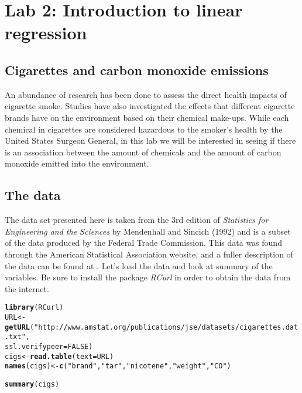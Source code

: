 \documentclass{article}\usepackage[]{graphicx}\usepackage[]{color}
\makeatletter
\newcommand{\hlnum}[1]{\textcolor[rgb]{0.686,0.059,0.569}{#1}}%
\newcommand{\hlstr}[1]{\textcolor[rgb]{0.192,0.494,0.8}{#1}}%
\newcommand{\hlstd}[1]{\textcolor[rgb]{0.345,0.345,0.345}{#1}}%
\newcommand{\hlkwb}[1]{\textcolor[rgb]{0.69,0.353,0.396}{#1}}%
\newcommand{\hlkwc}[1]{\textcolor[rgb]{0.333,0.667,0.333}{#1}}%
\newcommand{\hlkwd}[1]{\textcolor[rgb]{0.737,0.353,0.396}{\textbf{#1}}}%
\newenvironment{kframe}{%
 \def\at@end@of@kframe{}%
 \ifinner\ifhmode%
  \def\at@end@of@kframe{\end{minipage}}%
  \begin{minipage}{\columnwidth}%
 \fi\fi%
 \def\FrameCommand##1{\hskip\@totalleftmargin \hskip-\fboxsep
 \colorbox{shadecolor}{##1}\hskip-\fboxsep
     \hskip-\linewidth \hskip-\@totalleftmargin \hskip\columnwidth}%
 \MakeFramed {\advance\hsize-\width
   \@totalleftmargin\z@ \linewidth\hsize
   \@setminipage}}%
 {\par\unskip\endMakeFramed%
 \at@end@of@kframe}
\newenvironment{knitrout}{}{} %
\makeatother
\begin{document}

\section*{Lab 2: Introduction to linear regression}

\subsection*{Cigarettes and carbon monoxide emissions}

An abundance of research has been done to assess the direct health impacts of cigarette smoke. Studies have also investigated the effects that different cigarette brands have on the environment based on their chemical make-ups. While each chemical in cigarettes are considered hazardous to the smoker's health by the United States Surgeon General, in this lab we will be interested in seeing if there is an association between the amount of chemicals and the amount of carbon monoxide emitted into the environment. 

\subsection*{The data}

The data set presented here is taken from the 3rd edition of \emph{Statistics for
Engineering and the Sciences} by Mendenhall and Sincich (1992) and is a subset of the data produced by the Federal Trade Commission. This data was found through the American Statistical Association website, and a fuller description of the data can be found at . Let's load the data and look at summary of the variables. Be sure to install the package \emph{RCurl} in order to obtain the data from the internet.

\begin{knitrout}
\color{fgcolor}\begin{kframe}
\begin{alltt}
\hlkwd{library}\hlstd{(RCurl)}
\hlstd{URL} \hlkwb{<-}\hlkwd{getURL}\hlstd{(}\hlstr{"http://www.amstat.org/publications/jse/datasets/cigarettes.dat.txt"}\hlstd{,}
             \hlkwc{ssl.verifypeer}\hlstd{=}\hlnum{FALSE}\hlstd{)}
\hlstd{cigs} \hlkwb{<-}\hlkwd{read.table}\hlstd{(}\hlkwc{text}\hlstd{=URL)}
\hlkwd{names}\hlstd{(cigs)}\hlkwb{<-}\hlkwd{c}\hlstd{(}\hlstr{"brand"}\hlstd{,}\hlstr{"tar"}\hlstd{,}\hlstr{"nicotene"}\hlstd{,}\hlstr{"weight"}\hlstd{,}\hlstr{"CO"}\hlstd{)}

\hlkwd{summary}\hlstd{(cigs)}
\end{alltt}
\end{kframe}
\end{knitrout}
\end{document}
